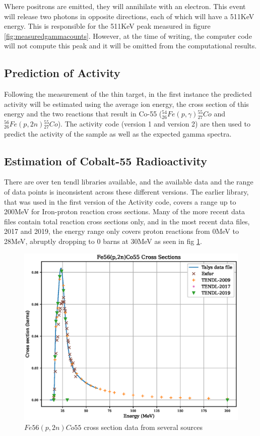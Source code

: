 Where positrons are emitted, they will annihilate with an electron.  This event will release two photons in opposite directions, each of which will have a 511KeV energy.  This is responsible for the 511KeV peak measured in figure \ref{fig:measuredgammacounts}.  However, at the time of writing, the computer code will not compute this peak and it will be omitted from the computational results.






\subsection{Prediction of Activity}

Following the measurement of the thin target, in the first instance the predicted activity will be estimated using the average ion energy, the cross section of this energy and the two reactions that result in Co-55 (${}^{54}_{26} Fe (p, \gamma) {}^{55}_{27} Co$ and ${}^{56}_{26} Fe (p, 2n) {}^{55}_{27} Co$).  The activity code (version 1 and version 2) are then used to predict the activity of the sample as well as the expected gamma spectra.




\FloatBarrier
\subsection{Estimation of Cobalt-55 Radioactivity}

There are over ten \acrshort{tendl} libraries available, and the available data and the range of data points is inconsistent across these different versions.  The earlier library, that was used in the first version of the Activity code, covers a range up to 200MeV for Iron-proton reaction cross sections.  Many of the more recent data files contain total reaction cross sections only, and in the most recent data files, 2017 and 2019, the energy range only covers proton reactions from 0MeV to 28MeV, abruptly dropping to 0 barns at 30MeV as seen in fig \ref{fig:fe56co55-cross-sections}.

\FloatBarrier
\begin{figure}[!htb]
\centering
\includegraphics[width=0.7\linewidth]{chapters/activity_code/fe56_co55/Fe56_Co55.eps}
\caption{$Fe56(p,2n)Co55$ cross section data from several sources \cite{tendl2009}\cite{tendl2017}\cite{tendl2019}\cite{exforco55}\cite{talys}}
\label{fig:fe56co55-cross-sections}
\end{figure}
\FloatBarrier

